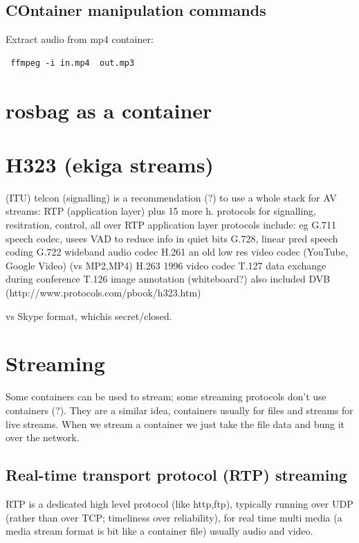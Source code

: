 \documentclass[oneside,english]{scrbook}
\begin{document}
\section{COntainer manipulation commands}

Extract audio from mp4 container:
\begin{lstlisting}
 ffmpeg -i in.mp4  out.mp3
\end{lstlisting}


\chapter{rosbag as a container}

\chapter{H323 (ekiga streams)}
 (ITU) telcon  (signalling)
	is a recommendation (?) to use a whole stack for AV streams:
		RTP (application layer)		
		plus 15 more h. protocols for signalling, resitration, control, all over RTP
		application layer protocols include:
			eg G.711 speech codec, usees VAD to reduce info in quiet bits
			    G.728, linear pred speech coding
			G.722 wideband audio codec
			H.261 an old low res video codec (YouTube, Google Video) (vs MP2,MP4)
			H.263 1996 video codec
			T.127 data exchange during conference
			T.126 image annotation (whiteboard?)
		also included DVB
		(http://www.protocols.com/pbook/h323.htm)

vs Skype format, whichis secret/closed.


\chapter{Streaming}
Some containers can be used to stream; some streaming protocols don't use containers (?). They are a similar idea, containers usually for files and streams for live streams. When we stream a container we just take the file data and bung it over the network.

\section{Real-time transport protocol (RTP) streaming}

RTP is a dedicated high level protocol (like http,ftp), typically running over UDP (rather than over TCP; timeliness over reliability), for real time multi media (a media stream format is bit like a container file) usually audio and video.
\end{document}

